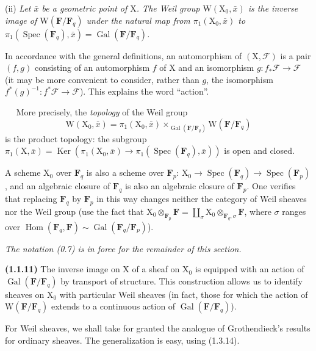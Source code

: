 \documentclass[11pt,leqno]{article}
\newcommand{\Page}[1]{\ifvmode\noindent\else\unskip\ \fi{\footnotesize\textcolor{gray}{[p.\,#1]}}\ \ignorespaces}
\begin{document}
(ii) \textit{Let \(\bar x\) be a geometric point of \(\mathrm{X}\). The \textup{Weil group} \(\mathrm{W}(\mathrm{X}_0,\bar x)\) is the inverse image of \(\mathrm{W}(\mathbf{F}/\mathbf{F}_q)\) under the natural map from \(\pi_1(\mathrm{X}_0,\bar x)\) to \(\pi_1(\operatorname{Spec}(\mathbf{F}_q),\bar x)=\operatorname{Gal}(\mathbf{F}/\mathbf{F}_q)\).}

In accordance with the general definitions, an automorphism of \((\mathrm{X},\mathscr{F})\) is a pair \((f,g)\) consisting of an automorphism \(f\) of \(\mathrm{X}\) and an isomorphism \(g:f_*\mathscr{F}\to\mathscr{F}\) (it may be more convenient to consider, rather than \(g\), the isomorphism \(f^*(g)^{-1}:f^*\mathscr{F}\to\mathscr{F}\)). This explains the word “action”.

\Page{152}
More precisely, the \textit{topology} of the Weil group
\[
\mathrm{W}(\mathrm{X}_0,\bar x)
=\pi_1(\mathrm{X}_0,\bar x)\times_{\operatorname{Gal}(\mathbf{F}/\mathbf{F}_q)}
\mathrm{W}(\mathbf{F}/\mathbf{F}_q)
\]
is the product topology: the subgroup \(\pi_1(\mathrm{X},\bar x)=\operatorname{Ker}(\pi_1(\mathrm{X}_0,\bar x)\to\pi_1(\operatorname{Spec}(\mathbf{F}_q),\bar x))\) is open and closed.

A scheme \(\mathrm{X}_0\) over \(\mathbf{F}_q\) is also a scheme over \(\mathbf{F}_p\): \(\mathrm{X}_0\to\operatorname{Spec}(\mathbf{F}_q)\to\operatorname{Spec}(\mathbf{F}_p)\), and an algebraic closure of \(\mathbf{F}_q\) is also an algebraic closure of \(\mathbf{F}_p\). One verifies that replacing \(\mathbf{F}_q\) by \(\mathbf{F}_p\) in this way changes neither the category of Weil sheaves nor the Weil group (use the fact that \(\mathrm{X}_0\otimes_{\mathbf{F}_p}\mathbf{F}=\coprod\limits_\sigma\mathrm{X}_0\otimes_{\mathbf{F}_q,\sigma}\mathbf{F}\), where \(\sigma\) ranges over \(\operatorname{Hom}(\mathbf{F}_q,\mathbf{F})\sim\operatorname{Gal}(\mathbf{F}_q/\mathbf{F}_p)\)).

\textit{The notation \textup{(0.7)} is in force for the remainder of this section.}

\textbf{(1.1.11)} The inverse image on \(\mathrm{X}\) of a sheaf on \(\mathrm{X}_0\) is equipped with an action of \(\operatorname{Gal}(\mathbf{F}/\mathbf{F}_q)\) by transport of structure. This construction allows us to identify sheaves on \(\mathrm{X}_0\) with particular Weil sheaves (in fact, those for which the action of \(\mathrm{W}(\mathbf{F}/\mathbf{F}_q)\) extends to a continuous action of \(\operatorname{Gal}(\mathbf{F}/\mathbf{F}_q)\)).

For Weil sheaves, we shall take for granted the analogue of Grothendieck's results for ordinary sheaves. The generalization is easy, using (1.3.14).
\end{document}
